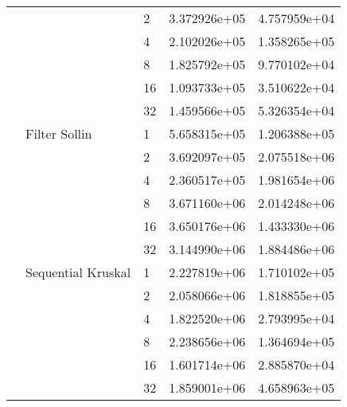 \begin{tabular}{lllrr}
                                                       &                     & 2  &  3.372926e+05 &  4.757959e+04 \\
                                                       &                     & 4  &  2.102026e+05 &  1.358265e+05 \\
                                                       &                     & 8  &  1.825792e+05 &  9.770102e+04 \\
                                                       &                     & 16 &  1.093733e+05 &  3.510622e+04 \\
                                                       &                     & 32 &  1.459566e+05 &  5.326354e+04 \\
                                                       & Filter Sollin & 1  &  5.658315e+05 &  1.206388e+05 \\
                                                       &                     & 2  &  3.692097e+05 &  2.075518e+06 \\
                                                       &                     & 4  &  2.360517e+05 &  1.981654e+06 \\
                                                       &                     & 8  &  3.671160e+06 &  2.014248e+06 \\
                                                       &                     & 16 &  3.650176e+06 &  1.433330e+06 \\
                                                       &                     & 32 &  3.144990e+06 &  1.884486e+06 \\
                                                       & Sequential Kruskal & 1  &  2.227819e+06 &  1.710102e+05 \\
                                                       &                     & 2  &  2.058066e+06 &  1.818855e+05 \\
                                                       &                     & 4  &  1.822520e+06 &  2.793995e+04 \\
                                                       &                     & 8  &  2.238656e+06 &  1.364694e+05 \\
                                                       &                     & 16 &  1.601714e+06 &  2.885870e+04 \\
                                                       &                     & 32 &  1.859001e+06 &  4.658963e+05 \\

\end{tabular}
